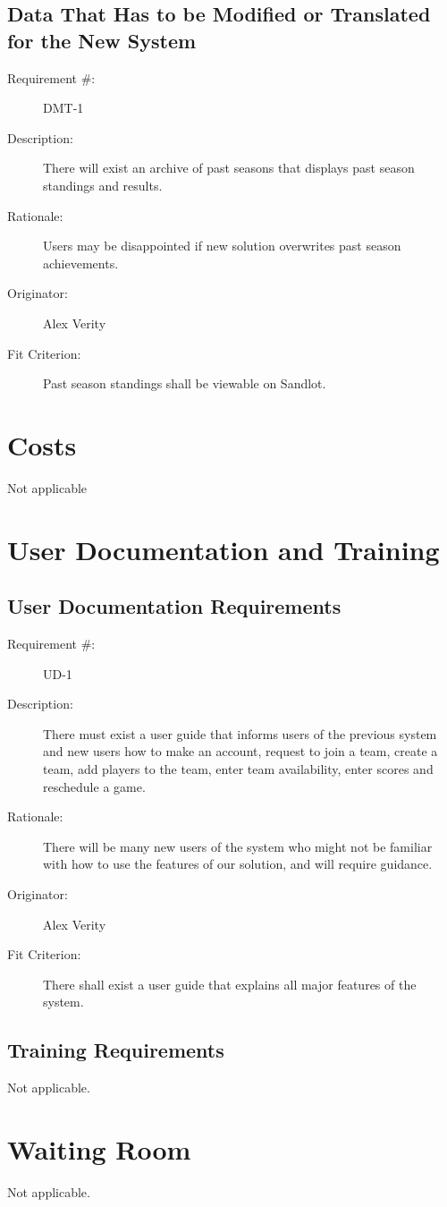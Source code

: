 \documentclass[12pt]{article}
\newenvironment{myreq}[1]{%
\setlist[description]{font=\normalfont\color{darkgray}}%
\begin{tcolorbox}[colframe=black,colback=white, sharp corners, boxrule=1pt]%
\bfseries\color{blue}%
\begin{description}#1}%
{\end{description}\end{tcolorbox}}
\newcommand{\twoinline}[2]{\begin{multicols}{2}#1 #2\end{multicols}}
\newcommand{\reqno}{\item[Requirement \#:]}
\newcommand{\reqdesc}{\item[Description:]}
\newcommand{\reqrat}{\item[Rationale:]}
\newcommand{\reqorig}{\item[Originator:]}
\newcommand{\reqfit}{\item[Fit Criterion:]}
\newcommand{\reqsatis}{\item[Customer Satisfaction:]}
\newcommand{\reqdissat}{\item[Customer Dissatisfaction:]}
\begin{document}
\subsection{Data That Has to be Modified or Translated for the New System}

\begin{myreq}
  \reqno DMT-1
  \reqdesc There will exist an archive of past seasons that displays past
  season standings and results.
  \reqrat Users may be disappointed if new solution overwrites past season
  achievements.
  \reqorig Alex Verity
  \reqfit Past season standings shall be viewable on Sandlot.
  \twoinline
    {\reqsatis 1}
    {\reqdissat 2}
\end{myreq}

\section{Costs}
Not applicable
\section{User Documentation and Training}
\subsection{User Documentation Requirements}

\begin{myreq}
  \reqno UD-1
  \reqdesc There must exist a user guide that informs users of the previous
  system and new users how to make an account, request to join a team, create
  a team, add players to the team, enter team availability, enter scores and
  reschedule a game.
  \reqrat There will be many new users of the system who might not be familiar
  with how to use the features of our solution, and will require guidance.
  \reqorig Alex Verity
  \reqfit There shall exist a user guide that explains all major features of
  the system.
  \twoinline
    {\reqsatis 3}
    {\reqdissat 1}
\end{myreq}

\subsection{Training Requirements}
Not applicable.

\section{Waiting Room}
Not applicable.
\end{document}
